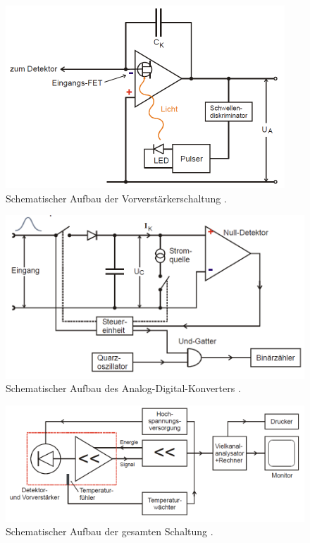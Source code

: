\begin{figure}
	\centering
	\includegraphics[width=\linewidth-70pt,height=\textheight-70pt,keepaspectratio]{content/images/Schaltung.pdf}
	\caption{Schematischer Aufbau der Vorverstärkerschaltung \cite{V18}.}
	\label{fig:Schalt}
\end{figure}
\begin{figure}
	\centering
	\includegraphics[width=\linewidth-70pt,height=\textheight-70pt,keepaspectratio]{content/images/Schaltung2.pdf}
	\caption{Schematischer Aufbau des Analog-Digital-Konverters \cite{V18}.}
	\label{fig:Schalt2}
\end{figure}
\begin{figure}
	\centering
	\includegraphics[width=\linewidth-50pt,height=\textheight-50pt,keepaspectratio]{content/images/Schaltung3.pdf}
	\caption{Schematischer Aufbau der gesamten Schaltung \cite{V18}.}
	\label{fig:Schalt3}
\end{figure}
